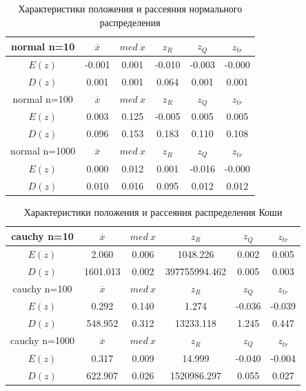 \begin{table}[H]
	\begin{center}
		\begin{tabular}{|c||c|c|c|c|c|}
			\hline
			normal n=10 & $\overline{x} $ & $med\:x$ & $z_{R}$ & $z_{Q}$ & $z_{tr}$ \\
			\hline\hline
			$E(z)$ & -0.001 & 0.001 & -0.010 & -0.003 & -0.000 \\
			\hline
			$D(z)$ & 0.001 & 0.001 & 0.064 & 0.001 & 0.001 \\
			\hline\hline
			normal n=100 & $\overline{x} $ & $med\:x$ & $z_{R}$ & $z_{Q}$ & $z_{tr}$ \\
			\hline\hline
			$E(z)$ & 0.003 & 0.125 & -0.005 & 0.005 & 0.005 \\
			\hline
			$D(z)$ & 0.096 & 0.153 & 0.183 & 0.110 & 0.108  \\
			\hline\hline
			normal n=1000 & $\overline{x} $ & $med\:x$ & $z_{R}$ & $z_{Q}$ & $z_{tr}$ \\
			\hline\hline
			$E(z)$ & 0.000 & 0.012 & 0.001 & -0.016 & -0.000 \\
			\hline
			$D(z)$ & 0.010 & 0.016 & 0.095 & 0.012 & 0.012 \\
			\hline
		\end{tabular}
	\end{center}
	\caption{Характеристики положения и рассеяния нормального распределения}
\end{table} 

\begin{table}[H]
	\begin{center}
		\begin{tabular}{|c||c|c|c|c|c|}
			\hline
			cauchy n=10 & $\overline{x} $ & $med\:x$ & $z_{R}$ & $z_{Q}$ & $z_{tr}$ \\
			\hline\hline
			$E(z)$ & 2.060 & 0.006 & 1048.226 & 0.002 & 0.005 \\
			\hline
			$D(z)$ & 1601.013 & 0.002 & 397755994.462 & 0.005 & 0.003 \\
			\hline\hline
			cauchy n=100 & $\overline{x} $ & $med\:x$ & $z_{R}$ & $z_{Q}$ & $z_{tr}$ \\
			\hline\hline
			$E(z)$ & 0.292 & 0.140 & 1.274 & -0.036 & -0.039 \\
			\hline
			$D(z)$ & 548.952 & 0.312 & 13233.118 & 1.245 & 0.447 \\
			\hline\hline
			cauchy n=1000 & $\overline{x} $ & $med\:x$ & $z_{R}$ & $z_{Q}$ & $z_{tr}$ \\
			\hline\hline
			$E(z)$ & 0.317 & 0.009 & 14.999 & -0.040 & -0.004 \\
			\hline
			$D(z)$ & 622.907 & 0.026 & 1520986.297 & 0.055 & 0.027 \\
			\hline
		\end{tabular}
	\end{center}
	\caption{Характеристики положения и рассеяния распределения Коши}
\end{table}

